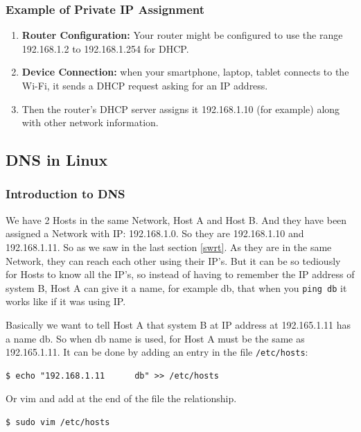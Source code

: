 \documentclass{article}
\newenvironment{codetemplate}[1][]{%
  \mybasecolorbox[#1]
  \itshape
}{%
  \endmybasecolorbox
}
\begin{document}
\subsubsection{Example of Private IP Assignment}
\begin{enumerate}
    \item \textbf{Router Configuration:} Your router might be configured to use the range 192.168.1.2 to 192.168.1.254 for DHCP.
    \item \textbf{Device Connection:} when your smartphone, laptop, tablet connects to the Wi-Fi, it sends a DHCP request asking for an IP address.
    \item Then the router's DHCP server assigns it 192.168.1.10 (for example) along with other network information.
\end{enumerate}

\subsection{DNS in Linux}

\subsubsection{Introduction to DNS}

We have 2 Hosts in the same Network, Host A and Host B. And they have been assigned a Network with IP: 192.168.1.0. So they are 192.168.1.10 and 192.168.1.11. So as we saw in the last section \ref{swrt}. As they are in the same Network, they can reach each other using their IP's. But it can be so tediously for Hosts to know all the IP's, so instead of having to remember the IP address of system B, Host A can give it a name, for example db, that when you \verb|ping db| it works like if it was using IP.

Basically we want to tell Host A that system B at IP address at 192.165.1.11 has a name db. So when db name is used, for Host A must be the same as 192.165.1.11. It can be done by adding an entry in the file \verb|/etc/hosts|:

\begin{codetemplate}{}
\begin{verbatim}
$ echo "192.168.1.11      db" >> /etc/hosts
\end{verbatim}
\end{codetemplate}

Or vim and add at the end of the file the relationship.
\begin{codetemplate}{}
\begin{verbatim}
$ sudo vim /etc/hosts
\end{verbatim}
\end{codetemplate}
\end{document}

